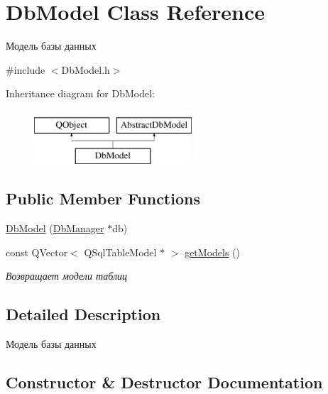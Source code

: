 \hypertarget{class_db_model}{}\section{Db\+Model Class Reference}
\label{class_db_model}


Модель базы данных  




{\ttfamily \#include $<$Db\+Model.\+h$>$}

Inheritance diagram for Db\+Model\+:\begin{figure}[H]
\begin{center}
\leavevmode
\includegraphics[height=2.000000cm]{class_db_model}
\end{center}
\end{figure}
\subsection*{Public Member Functions}
\begin{DoxyCompactItemize}
\item 
\hyperlink{class_db_model_ae102f26485df0f84f97132e7f2066771}{Db\+Model} (\hyperlink{class_db_manager}{Db\+Manager} $\ast$db)
\item 
const Q\+Vector$<$ Q\+Sql\+Table\+Model $\ast$ $>$ \hyperlink{class_db_model_aa185ea5bffa09016b3efb99591d173d3}{get\+Models} ()
\begin{DoxyCompactList}\small\item\em Возвращает модели таблиц \end{DoxyCompactList}\end{DoxyCompactItemize}


\subsection{Detailed Description}
Модель базы данных 

\subsection{Constructor \& Destructor Documentation}
\mbox{\label{class_db_model_ae102f26485df0f84f97132e7f2066771}} 
